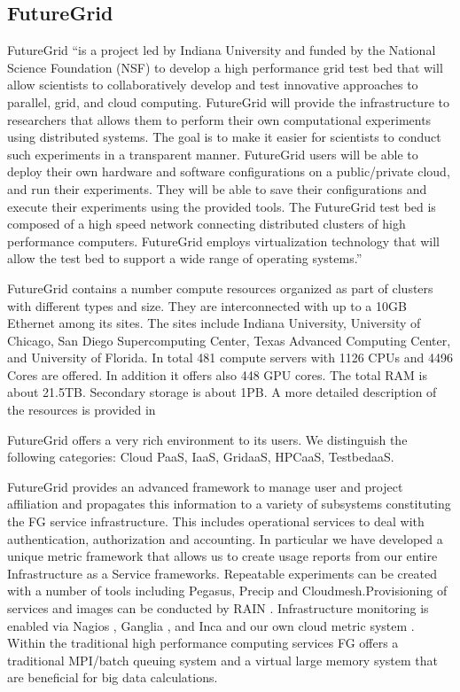 \documentclass{tex/sig-alternate-2013}
\newcommand{\todo}[1]{{\color{red}{#1}}}
\begin{document}
\todo{DO NOT READ TILL YOU FIND ANOTHER READ}

\subsection{FutureGrid}



FutureGrid \cite{las2010gce,las12fg-bookchapter} ``is a project led by Indiana University and funded by the National Science Foundation (NSF) to develop a high performance grid test bed that will allow scientists to collaboratively develop and test innovative approaches to parallel, grid, and cloud computing. FutureGrid will provide the infrastructure to researchers that allows them to perform their own computational experiments using distributed systems. The goal is to make it easier for scientists to conduct such experiments in a transparent manner.  FutureGrid users will be able to deploy their own hardware and software configurations on a public/private cloud, and run their experiments. They will be able to save their configurations and execute their experiments using the provided tools. The FutureGrid test bed is composed of a high speed network connecting distributed clusters of high performance computers. FutureGrid employs virtualization technology that will allow the test bed to support a wide range of operating systems.''



FutureGrid contains a number compute resources organized as part of clusters with different types and size. They are interconnected with up to a 10GB Ethernet among its sites. The sites include Indiana University, University of Chicago, San Diego Supercomputing Center, Texas Advanced Computing Center, and University of Florida.  In total 481 compute servers with 1126 CPUs and 4496 Cores are offered. In addition it offers also 448 GPU cores. The total RAM is about 21.5TB. Secondary storage is about 1PB. A more detailed description of the resources is provided in \cite{vonLaszewski-bigdata-bookchapter2014}

FutureGrid offers a very rich environment to its users. We distinguish the following categories: Cloud PaaS, IaaS, GridaaS, HPCaaS, TestbedaaS.

FutureGrid provides an advanced framework to manage user and project affiliation and propagates this information to a variety of subsystems constituting the FG service infrastructure. This includes operational services to deal with authentication, authorization and accounting. In particular we have developed a unique metric framework that allows us to create usage reports from our entire Infrastructure as a Service frameworks. Repeatable experiments can be created with a number of tools including Pegasus, Precip and Cloudmesh.Provisioning of services and images can be conducted by RAIN \cite{imagemanagement,fg-1295}. Infrastructure monitoring is enabled via Nagios \cite{nagios}, Ganglia \cite{ganglia}, and Inca \cite{inca} and our own cloud metric system \cite{las08federated-cloud}.
Within the traditional high performance computing services FG offers a traditional MPI/batch queuing system and a virtual large memory system that are beneficial for big data calculations.
\end{document}
